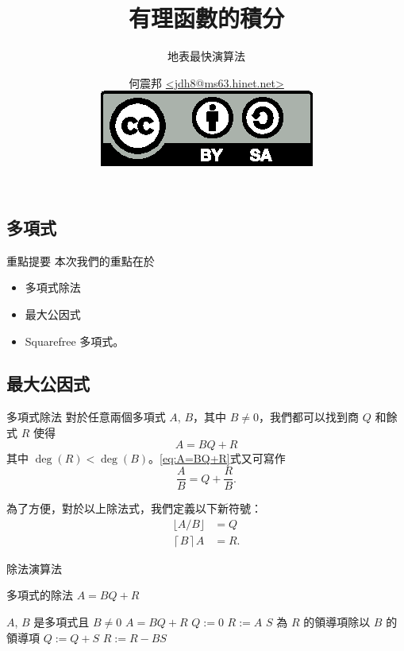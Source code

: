 \documentclass{beamer}
\title[積分有理函數]{有理函數的積分}
\subtitle{地表最快演算法}
\author[何震邦]{何震邦 \href{mailto:jdh8@ms63.hinet.net}{\textless jdh8@ms63.hinet.net\textgreater}\\
    \href{http://creativecommons.org/licenses/by-sa/3.0/tw/deed.zh\textunderscore TW}{\includegraphics{by-sa.eps}}}
\theoremstyle{remark}
\begin{document}
\begin{CJK}{UTF8}{bsmi}
\maketitle

\section{多項式}
\begin{frame}{重點提要}
  本次我們的重點在於
  \begin{itemize}
    \item 多項式除法
    \item 最大公因式
    \item Squarefree 多項式。
  \end{itemize}
\end{frame}

\subsection{最大公因式}
\begin{frame}{多項式除法}
  對於任意兩個多項式 $A$, $B$，其中 $B \ne 0$，我們都可以找到商 $Q$ 和餘式 $R$ 使得
  \begin{equation}
    A = BQ + R \label{eq:A=BQ+R}
  \end{equation}
  其中 $\deg(R) < \deg(B)$。\eqref{eq:A=BQ+R}式又可寫作
  \[\frac A B = Q + \frac R B.\]
  \begin{definition}
    為了方便，對於以上除法式，我們定義以下新符號：
    \begin{align*}
      \lfloor A/B \rfloor &= Q\\
      \left\lceil B \right\rceil A &= R.
    \end{align*}
  \end{definition}
\end{frame}

\begin{frame}{除法演算法}
  \begin{algorithm}[H]
    \caption{多項式的除法 $A = BQ + R$}
    \begin{algorithmic}[1]
      \REQUIRE $A$, $B$ 是多項式且 $B \ne 0$
      \ENSURE  $A = BQ + R$
      \STATE $Q := 0$
      \STATE $R := A$
	\STATE $S$ 為 $R$ 的領導項除以 $B$ 的領導項
	\STATE $Q := Q + S$
	\STATE $R := R - BS$
      \ENDWHILE
    \end{algorithmic}
  \end{algorithm}
\end{frame}


\end{CJK}
\end{document}
